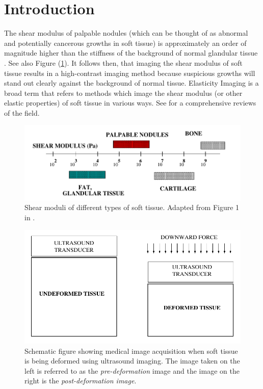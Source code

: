 \documentclass[12pt]{article}
\begin{document}
\section{Introduction}
The shear modulus of palpable nodules (which can be thought of as abnormal and potentially cancerous growths in soft tissue) is approximately an order of magnitude higher than the stiffness of the background of normal glandular tissue \cite{paper:sarv1998}. See also Figure (\ref{fig:shearmod}). It follows then, that imaging the shear modulus of soft tissue results in a high-contrast imaging method because suspicious growths will stand out clearly against the background of normal tissue. Elasticity Imaging is a broad term that refers to methods which image the shear modulus (or other elastic properties) of soft tissue in various ways. See \cite{paper:gao1996,paper:parker2010,book:alamgarra2019,bookchap:oberaibarbone2019} for a comprehensive reviews of the field.
%
\begin{figure}
   \centering
    \includegraphics[totalheight=3cm]{Figures/shearmod.png}
  \caption{\label{fig:shearmod} Shear moduli of different types of soft tissue. Adapted from Figure 1 in \cite{paper:sarv1998}.}
\end{figure}
%
\begin{figure}
   \centering
    \includegraphics[totalheight=5cm]{Figures/prepostimage.png}
  \caption{\label{fig:prepostimage} Schematic figure showing medical image acquisition when soft tissue is being deformed using ultrasound imaging. The image taken on the left is referred to as the \textit{pre-deformation} image and the image on the right is the \textit{post-deformation image}.}
\end{figure}
%
\end{document}
